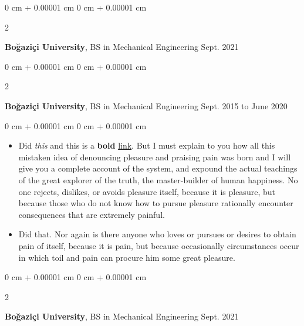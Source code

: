 \documentclass[10pt, letterpaper]{article}
\newenvironment{highlights}{
    \begin{itemize}[
        topsep=0.10 cm,
        parsep=0.10 cm,
        partopsep=0pt,
        itemsep=0pt,
        leftmargin=0 cm + 10pt
    ]
}{
    \end{itemize}
} %
\newenvironment{onecolentry}{
    \begin{adjustwidth}{
        0 cm + 0.00001 cm
    }{
        0 cm + 0.00001 cm
    }
}{
    \end{adjustwidth}
} %
\newenvironment{twocolentry}[2][]{
    \onecolentry
    \def\secondColumn{#2}
    \setcolumnwidth{\fill, 4.5 cm}
    \begin{paracol}{2}
}{
    \switchcolumn \raggedleft \secondColumn
    \end{paracol}
    \endonecolentry
} %
\begin{document}
        \vspace{0.2 cm}

        \begin{twocolentry}{
            Sept. 2021
        }
            \textbf{Boğaziçi University}, BS in Mechanical Engineering\end{twocolentry}



        \vspace{0.2 cm}

        \begin{twocolentry}{
            Sept. 2015 to June 2020
        }
            \textbf{Boğaziçi University}, BS in Mechanical Engineering\end{twocolentry}

        \vspace{0.10 cm}
        \begin{onecolentry}
            \begin{highlights}
                \item Did \textit{this} and this is a \textbf{bold} \href{https://example.com}{link}. But I must explain to you how all this mistaken idea of denouncing pleasure and praising pain was born and I will give you a complete account of the system, and expound the actual teachings of the great explorer of the truth, the master-builder of human happiness. No one rejects, dislikes, or avoids pleasure itself, because it is pleasure, but because those who do not know how to pursue pleasure rationally encounter consequences that are extremely painful.
                \item Did that. Nor again is there anyone who loves or pursues or desires to obtain pain of itself, because it is pain, but because occasionally circumstances occur in which toil and pain can procure him some great pleasure.
            \end{highlights}
        \end{onecolentry}


        \vspace{0.2 cm}

        \begin{twocolentry}{
            Sept. 2021
        }
            \textbf{Boğaziçi University}, BS in Mechanical Engineering\end{twocolentry}
\end{document}
